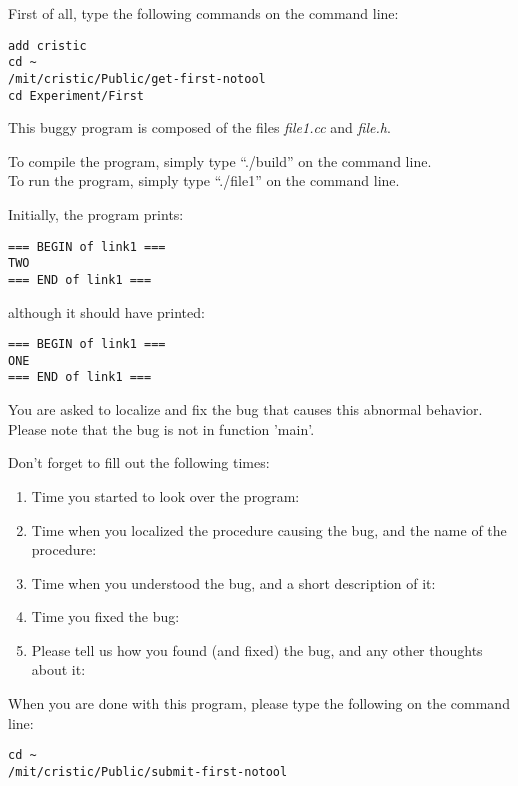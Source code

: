\documentclass{article}
\title{}
\author{Bug 1 - No Tool}
\date{July 30, 2003}
\begin{document}
\maketitle
\begin{flushleft}
\vspace{0.5in}

\thispagestyle{empty}

First of all, type the following commands on the command line:
\begin{verbatim}
add cristic
cd ~
/mit/cristic/Public/get-first-notool
cd Experiment/First
\end{verbatim}


\vspace{0.1in}
This buggy program is composed of the files {\it file1.cc} and 
{\it file.h}. 

\vspace{0.1in}
To compile the program, simply type ``./build'' on the command line.\\
To run the program, simply type ``./file1'' on the command line.


\vspace{0.1in}
Initially, the program prints:

\begin{verbatim}
=== BEGIN of link1 ===
TWO
=== END of link1 ===
\end{verbatim}

although it should have printed:
\begin{verbatim}
=== BEGIN of link1 ===
ONE
=== END of link1 ===
\end{verbatim}

You are asked to localize and fix the bug that causes this abnormal behavior.
Please note that the bug is not in function 'main'.


\vspace{0.3in}
Don't forget to fill out the following times:
\begin{enumerate}
\item{Time you started to look over the program:}
\item{Time when you localized the procedure causing the bug, and the name
      of the procedure:\vspace{0.2in}}
\item{Time when you understood the bug, and a short description of it:\vspace{0.4in}}

\item{Time you fixed the bug:}

\item{Please tell us how you found (and fixed) the bug, and any other thoughts 
about it:}

\end{enumerate}

\vspace{0.45in}
When you are done with this program, please type the following on the 
command line:
\begin{verbatim}
cd ~
/mit/cristic/Public/submit-first-notool
\end{verbatim}


\end{flushleft}
\end{document}
